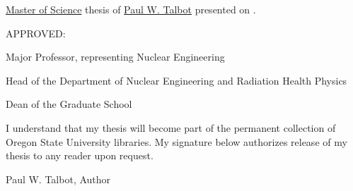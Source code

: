 
\thispagestyle{empty}

\noindent \underline{Master of Science} thesis of
	  \underline{Paul W. Talbot} presented on
	  \underline{\myDefenseDate}.

\vspace{0.5in}

\noindent APPROVED:

\vspace{1.0in}

\noindent \hrulefill 

\noindent Major Professor, representing Nuclear Engineering

\vspace{1.0in}

\noindent \hrulefill

\noindent Head of the Department of Nuclear Engineering and Radiation Health Physics

\vspace{1.0in}

\noindent \hrulefill

\noindent Dean of the Graduate School

\vspace{1.0in}

\noindent I understand that my thesis will become part of the
	  permanent collection of Oregon State University
	  libraries.  My signature below authorizes release 
	  of my thesis to any reader upon request.

\vspace{0.9in}

\noindent \hrulefill 

\begin{center}
   Paul W. Talbot, Author
\end{center}

